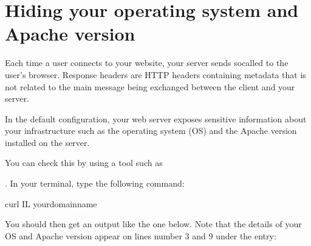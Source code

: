 \documentclass[a4paper,10pt,english,openany,oneside]{sphinxmanual}
\begin{document}
\section{Hiding your operating system and Apache version}
\label{\detokenize{hardening-apache:hiding-your-operating-system-and-apache-version}}
\sphinxAtStartPar
Each time a user connects to your website, your server sends so\sphinxhyphen{}called  to the user’s browser. Response headers are HTTP headers containing metadata that is not related to the main message being exchanged between the client and your server.

\sphinxAtStartPar
In the default configuration, your web server exposes sensitive information about your infrastructure such as the operating system (OS) and the Apache version installed on the server.

\sphinxAtStartPar
You can check this by using a tool such as %
\begin{footnote}[17]\sphinxAtStartFootnote
{}
%
\end{footnote}. In your terminal, type the following command:

\begin{sphinxVerbatim}[commandchars=\\\{\}]
\PYGZdl{} curl \PYGZhy{}IL your\PYGZhy{}domain\PYGZhy{}name
\end{sphinxVerbatim}

\sphinxAtStartPar
You should then get an output like the one below. Note that the details of your OS and Apache version appear on lines number 3 and 9 under the  entry:
\end{document}
